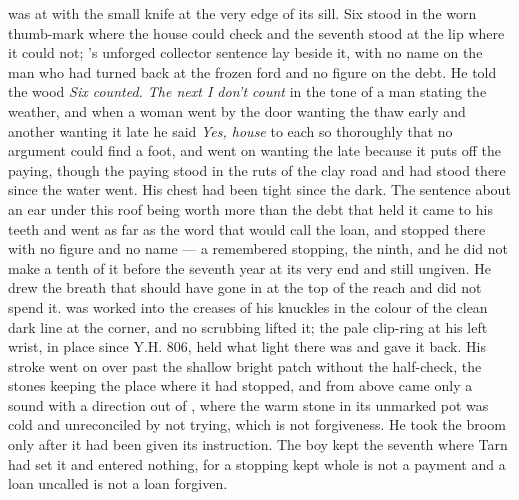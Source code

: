 \scenebreak

 was at  with the small knife at the very edge of its sill. Six stood in the worn thumb-mark where the house could check and the seventh stood at the lip where it could not; 's unforged collector sentence lay beside it, with no name on the man who had turned back at the frozen ford and no figure on the debt. He told the wood \emph{Six counted. The next I don't count} in the tone of a man stating the weather, and when a woman went by the door wanting the thaw early and another wanting it late he said \emph{Yes, house} to each so thoroughly that no argument could find a foot, and went on wanting the late because it puts off the paying, though the paying stood in the ruts of the clay road and had stood there since the water went. His chest had been tight since the dark. The sentence about an ear under this roof being worth more than the debt that held it came to his teeth and went as far as the word that would call the loan, and stopped there with no figure and no name --- a remembered stopping, the ninth, and he did not make a tenth of it before the seventh year at its very end and still ungiven. He drew the breath that should have gone in at the top of the reach and did not spend it.  was worked into the creases of his knuckles in the colour of the clean dark line at the corner, and no scrubbing lifted it; the pale clip-ring at his left wrist, in place since Y.H. 806, held what light there was and gave it back. His stroke went on over  past the shallow bright patch without the half-check, the stones keeping the place where it had stopped, and from above came only a sound with a direction out of , where the warm stone in its unmarked pot was cold and unreconciled by not trying, which is not forgiveness. He took the broom only after it had been given its instruction. The boy kept the seventh where Tarn had set it and entered nothing, for a stopping kept whole is not a payment and a loan uncalled is not a loan forgiven.

